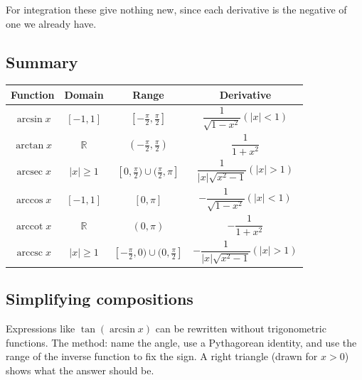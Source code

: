 \documentclass[12pt,letterpaper]{article}
\theoremstyle{definition}
\DeclareMathOperator{\arcsec}{arcsec}
\DeclareMathOperator{\arccot}{arccot}
\DeclareMathOperator{\arccsc}{arccsc}
\begin{document}
For integration these give nothing new, since each derivative is the negative
of one we already have.

\subsection{Summary}

\begin{center}
  \renewcommand{\arraystretch}{2.1}
  \begin{tabular}{|c|c|c|c|}
    \hline
    \textbf{Function} & \textbf{Domain} & \textbf{Range}
      & \textbf{Derivative} \\
    \hline
    $\arcsin x$ & $[-1,1]$ & $[-\frac\pi2,\frac\pi2]$
      & $\dfrac{1}{\sqrt{1-x^2}}$\quad$(|x|<1)$ \\
    \hline
    $\arctan x$ & $\mathbb{R}$ & $(-\frac\pi2,\frac\pi2)$
      & $\dfrac{1}{1+x^2}$ \\
    \hline
    $\arcsec x$ & $|x|\geq1$ & $[0,\frac\pi2)\cup(\frac\pi2,\pi]$
      & $\dfrac{1}{|x|\sqrt{x^2-1}}$\quad$(|x|>1)$ \\
    \hline
    $\arccos x$ & $[-1,1]$ & $[0,\pi]$
      & $-\dfrac{1}{\sqrt{1-x^2}}$\quad$(|x|<1)$ \\
    \hline
    $\arccot x$ & $\mathbb{R}$ & $(0,\pi)$
      & $-\dfrac{1}{1+x^2}$ \\
    \hline
    $\arccsc x$ & $|x|\geq1$ & $[-\frac\pi2,0)\cup(0,\frac\pi2]$
      & $-\dfrac{1}{|x|\sqrt{x^2-1}}$\quad$(|x|>1)$ \\
    \hline
  \end{tabular}
\end{center}

\subsection{Simplifying compositions}\label{sec:triangles}

Expressions like $\tan(\arcsin x)$ can be rewritten without trigonometric
functions. The method: name the angle, use a Pythagorean identity, and use the
range of the inverse function to fix the sign. A right triangle (drawn for
$x>0$) shows what the answer should be.
\end{document}
